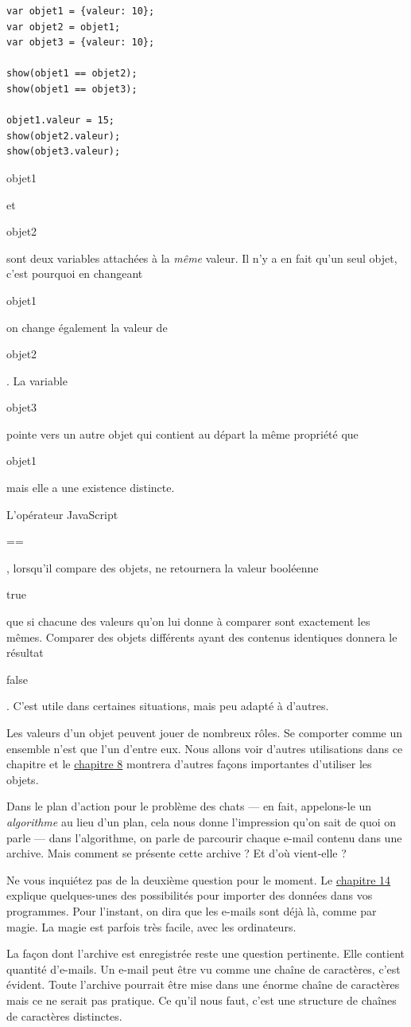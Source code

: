 \documentclass{FramateX}
\renewcommand{\texttt}[1]{\begin{sffamily}{#1}\end{sffamily}}
\begin{document}
\begin{lstlisting}
var objet1 = {valeur: 10};
var objet2 = objet1;
var objet3 = {valeur: 10};

show(objet1 == objet2);
show(objet1 == objet3);

objet1.valeur = 15;
show(objet2.valeur);
show(objet3.valeur);
\end{lstlisting}
\texttt{objet1} et \texttt{objet2} sont deux variables attachées à la
\emph{même} valeur. Il n'y a en fait qu'un seul objet, c'est pourquoi en
changeant \texttt{objet1} on change également la valeur de
\texttt{objet2}. La variable \texttt{objet3} pointe vers un autre objet
qui contient au départ la même propriété que \texttt{objet1} mais elle a
une existence distincte.

L'opérateur JavaScript \texttt{==}, lorsqu'il compare des objets, ne
retournera la valeur booléenne \texttt{true} que si chacune des valeurs
qu'on lui donne à comparer sont exactement les mêmes. Comparer des
objets différents ayant des contenus identiques donnera le résultat
\texttt{false}. C'est utile dans certaines situations, mais peu adapté à
d'autres.

\begin{center}\end{center}

Les valeurs d'un objet peuvent jouer de nombreux rôles. Se comporter
comme un ensemble n'est que l'un d'entre eux. Nous allons voir d'autres
utilisations dans ce chapitre et le \href{chapter8.html}{chapitre 8}
montrera d'autres façons importantes d'utiliser les objets.

Dans le plan d'action pour le problème des chats --- en fait,
appelons-le un \emph{algorithme} au lieu d'un plan, cela nous donne
l'impression qu'on sait de quoi on parle --- dans l'algorithme, on parle
de parcourir chaque e-mail contenu dans une archive. Mais comment se
présente cette archive ? Et d'où vient-elle ?

Ne vous inquiétez pas de la deuxième question pour le moment. Le
\href{chapter14.html}{chapitre 14} explique quelques-unes des
possibilités pour importer des données dans vos programmes. Pour
l'instant, on dira que les e-mails sont déjà là, comme par magie. La
magie est parfois très facile, avec les ordinateurs.

\begin{center}\end{center}

La façon dont l'archive est enregistrée reste une question pertinente.
Elle contient quantité d'e-mails. Un e-mail peut être vu comme une
chaîne de caractères, c'est évident. Toute l'archive pourrait être mise
dans une énorme chaîne de caractères mais ce ne serait pas pratique. Ce
qu'il nous faut, c'est une structure de chaînes de caractères
distinctes.
\end{document}

